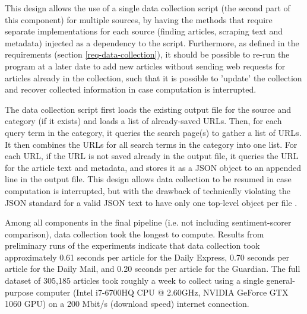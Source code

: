 \documentclass{report}
\begin{document}
This design allows the use of a single data collection script (the second part of this component) for multiple sources, by having the methods that require separate implementations for each source (finding articles, scraping text and metadata) injected as a dependency to the script.
Furthermore, as defined in the requirements (section \ref{req-data-collection}), it should be possible to re-run the program at a later date to add new articles without sending web requests for articles already in the collection, such that it is possible to 'update' the collection and recover collected information in case computation is interrupted.

The data collection script first loads the existing output file for the source and category (if it exists) and loads a list of already-saved URLs.
Then, for each query term in the category, it queries the search page(s) to gather a list of URLs.
It then combines the URLs for all search terms in the category into one list.
For each URL, if the URL is not saved already in the output file, it queries the URL for the article text and metadata, and stores it as a JSON object to an appended line in the output file.
This design allows data collection to be resumed in case computation is interrupted, but with the drawback of technically violating the JSON standard for a valid JSON text to have only one top-level object per file \cite{rfc8259}.

Among all components in the final pipeline (i.e. not including sentiment-scorer comparison), data collection took the longest to compute.
Results from preliminary runs of the experiments indicate that data collection took approximately 0.61 seconds per article for the Daily Express, 0.70 seconds per article for the Daily Mail, and 0.20 seconds per article for the Guardian. %
The full dataset of 305,185 articles took roughly a week to collect using a single general-purpose computer (Intel i7-6700HQ CPU @ 2.60GHz, NVIDIA GeForce GTX 1060 GPU) on a 200 Mbit/s (download speed) internet connection.
\end{document}
